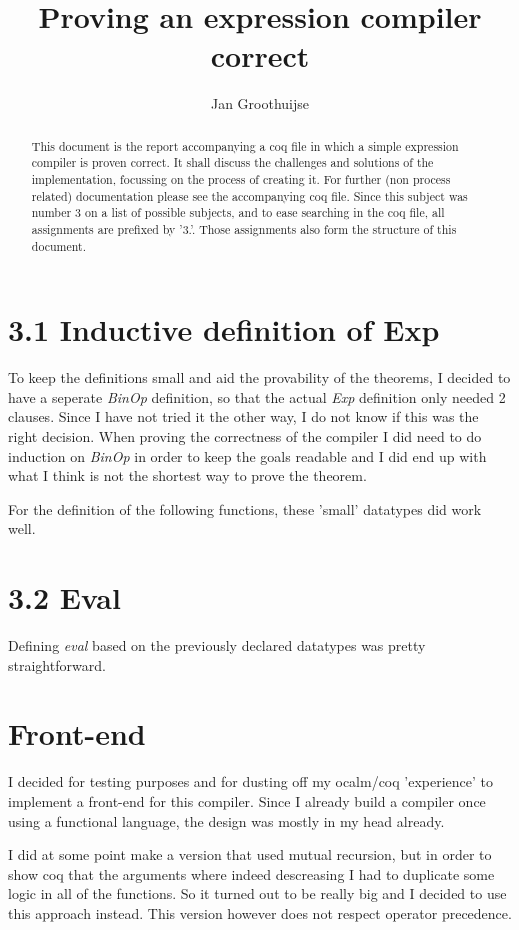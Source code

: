 \documentclass[10pt,a4paper,usenames,dvipnames]{article}
\author{ Jan Groothuijse }
\title{ Proving an expression compiler correct }
\begin{document}
\maketitle
\begin{abstract}
This document is the report accompanying a coq file in which a simple expression compiler is proven correct. 
It shall discuss the challenges and solutions of the implementation, focussing on the process of creating it.
For further (non process related) documentation please see the accompanying coq file. Since this subject was number
3 on a list of possible subjects, and to ease searching in the coq file, all assignments are prefixed by '3.'. 
Those assignments also form the structure of this document.
\end{abstract}

\section*{3.1 Inductive definition of Exp}
To keep the definitions small and aid the provability of the theorems, I decided to have a seperate \emph{BinOp} definition, so that
the actual \emph{Exp} definition only needed 2 clauses. Since I have not tried it the other way, I do not know if this was the right
decision. When proving the correctness of the compiler I did need to do induction on \emph{BinOp} in order to keep the goals readable and I did end up with what I think is not the shortest way to prove the theorem.

For the definition of the following functions, these 'small' datatypes did work well.

\section*{3.2 Eval }
Defining \emph{eval} based on the previously declared datatypes was pretty straightforward.

\section*{ Front-end }
I decided for testing purposes and for dusting off my ocalm/coq 'experience' to implement a front-end for this compiler.
Since I already build a compiler once using a functional language, the design was mostly in my head already.

I did at some point make a version that used mutual recursion, but in order to show coq that the arguments where indeed descreasing I had to duplicate some logic in all of the functions. So it turned out to be really big and I decided to use
this approach instead. This version however does not respect operator precedence.
\end{document}
